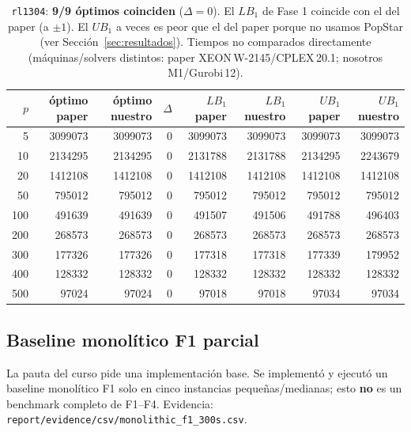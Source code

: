 \begin{table}[h]\centering\small
\begin{tabular}{rrrrrrrr}
\toprule
$p$ & óptimo paper & óptimo nuestro & $\Delta$ & $LB_1$ paper & $LB_1$ nuestro & $UB_1$ paper & $UB_1$ nuestro \\
\midrule
5   & 3099073 & 3099073 & 0 & 3099073 & 3099073 & 3099073 & 3099073 \\
10  & 2134295 & 2134295 & 0 & 2131788 & 2131788 & 2134295 & 2243679 \\
20  & 1412108 & 1412108 & 0 & 1412108 & 1412108 & 1412108 & 1412108 \\
50  &  795012 &  795012 & 0 &  795012 &  795012 &  795012 &  795012 \\
100 &  491639 &  491639 & 0 &  491507 &  491506 &  491788 &  496403 \\
200 &  268573 &  268573 & 0 &  268573 &  268573 &  268573 &  268573 \\
300 &  177326 &  177326 & 0 &  177318 &  177318 &  177339 &  179952 \\
400 &  128332 &  128332 & 0 &  128332 &  128332 &  128332 &  128332 \\
500 &   97024 &   97024 & 0 &   97018 &   97018 &   97034 &   97034 \\
\bottomrule
\end{tabular}
\caption{\texttt{rl1304}: \textbf{9/9 óptimos coinciden} ($\Delta=0$). El $LB_1$ de Fase 1
coincide con el del paper (a $\pm1$). El $UB_1$ a veces es peor que el del paper porque no usamos
PopStar (ver Sección~\ref{sec:resultados}). Tiempos no comparados directamente
(máquinas/solvers distintos: paper XEON\,W-2145/CPLEX\,20.1; nosotros M1/Gurobi\,12).}
\label{tab:paper}
\end{table}

\subsection{Baseline monolítico F1 parcial}
La pauta del curso pide una implementación base. Se implementó y ejecutó un baseline monolítico
F1 solo en cinco instancias pequeñas/medianas; esto \textbf{no} es un benchmark completo de
F1--F4. Evidencia: \texttt{report/evidence/csv/monolithic\_f1\_300s.csv}.

